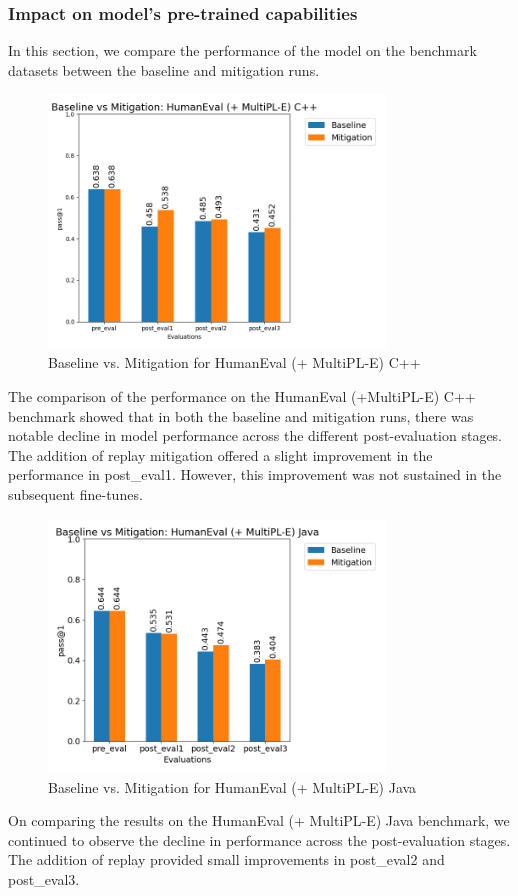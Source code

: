 \subsubsection{Impact on model's pre-trained capabilities}
In this section, we compare the performance of the model on the benchmark datasets between the baseline and mitigation runs.
\begin{figure}[H]
    \centering
    \includegraphics[width=0.8\textwidth]{Figures/results/code_comparisons/human_eval/comparison_humaneval_cpp.png} 
    \caption{Baseline vs. Mitigation for HumanEval (+ MultiPL-E) C++}
    \label{fig:CppComparison}
\end{figure}
The comparison of the performance on the HumanEval (+MultiPL-E) C++ benchmark showed that in both the baseline and mitigation runs, there was notable decline in model performance across the different post-evaluation stages. The addition of replay mitigation offered a slight improvement in the performance in post\_eval1. However, this improvement was not sustained in the subsequent fine-tunes.

\begin{figure}[H]
    \centering
    \includegraphics[width=0.8\textwidth]{Figures/results/code_comparisons/human_eval/comparison_humaneval_java.png} 
    \caption{Baseline vs. Mitigation for HumanEval (+ MultiPL-E) Java}
    \label{fig:JavaComparison}
\end{figure}
On comparing the results on the HumanEval (+ MultiPL-E) Java benchmark, we continued to observe the decline in performance across the post-evaluation stages. The addition of replay provided small improvements in post\_eval2 and post\_eval3.

